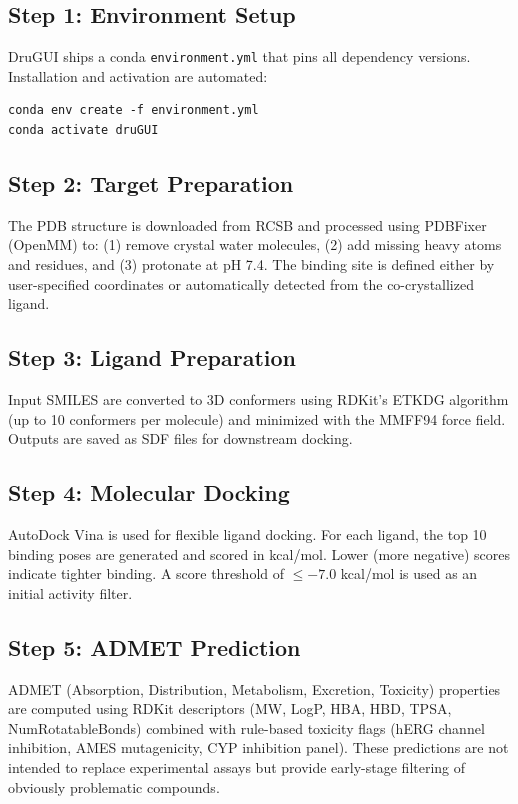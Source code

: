 \documentclass[10pt,oneside]{article}
\begin{document}
\subsection{Step 1: Environment Setup}
DruGUI ships a conda \texttt{environment.yml} that pins all dependency versions. Installation and activation are automated:

\begin{verbatim}
conda env create -f environment.yml
conda activate druGUI
\end{verbatim}

\subsection{Step 2: Target Preparation}
The PDB structure is downloaded from RCSB and processed using PDBFixer (OpenMM) to: (1) remove crystal water molecules, (2) add missing heavy atoms and residues, and (3) protonate at pH 7.4. The binding site is defined either by user-specified coordinates or automatically detected from the co-crystallized ligand.

\subsection{Step 3: Ligand Preparation}
Input SMILES are converted to 3D conformers using RDKit's ETKDG algorithm (up to 10 conformers per molecule) and minimized with the MMFF94 force field. Outputs are saved as SDF files for downstream docking.

\subsection{Step 4: Molecular Docking}
AutoDock Vina \citep{trott2010autodock} is used for flexible ligand docking. For each ligand, the top 10 binding poses are generated and scored in kcal/mol. Lower (more negative) scores indicate tighter binding. A score threshold of $\leq -7.0$ kcal/mol is used as an initial activity filter.

\subsection{Step 5: ADMET Prediction}
ADMET (Absorption, Distribution, Metabolism, Excretion, Toxicity) properties are computed using RDKit descriptors (MW, LogP, HBA, HBD, TPSA, NumRotatableBonds) combined with rule-based toxicity flags (hERG channel inhibition, AMES mutagenicity, CYP inhibition panel). These predictions are not intended to replace experimental assays but provide early-stage filtering of obviously problematic compounds.
\end{document}
